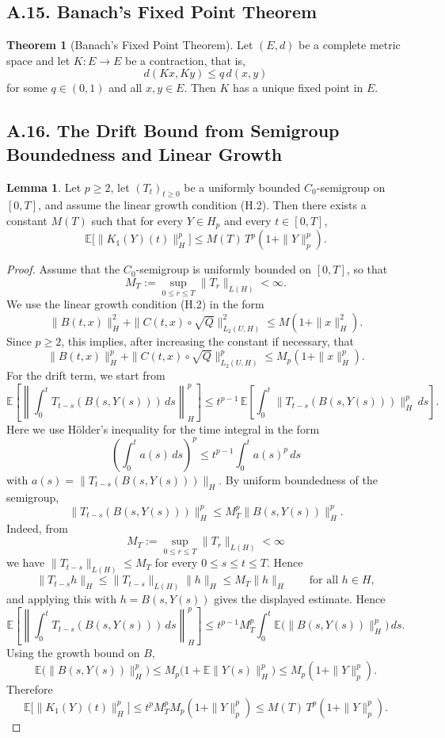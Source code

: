\documentclass[11pt]{article}
\theoremstyle{definition}
\newtheorem{theorem}{Theorem}
\newtheorem{lemma}{Lemma}
\theoremstyle{remark}
\begin{document}
\subsection*{A.15. Banach's Fixed Point Theorem}
\begin{theorem}[Banach's Fixed Point Theorem]
Let \((E,d)\) be a complete metric space and let \(K:E\to E\) be a contraction, that is,
\[
d(Kx,Ky)\le q\,d(x,y)
\]
for some \(q\in(0,1)\) and all \(x,y\in E\). Then \(K\) has a unique fixed point in \(E\).
\end{theorem}

\subsection*{A.16. The Drift Bound from Semigroup Boundedness and Linear Growth}
\begin{lemma}
Let \(p\ge 2\), let \((T_t)_{t\ge 0}\) be a uniformly bounded \(C_0\)-semigroup on \([0,T]\), and assume the linear growth condition \textnormal{(H.2)}. Then there exists a constant \(M(T)\) such that for every \(Y\in H_p\) and every \(t\in[0,T]\),
\[
\mathbb E\bigl[\|K_1(Y)(t)\|_H^p\bigr]
\le
M(T)\,T^p(1+\|Y\|_p^p).
\]
\end{lemma}
\begin{proof}
Assume that the \(C_0\)-semigroup is uniformly bounded on \([0,T]\), so that
\[
M_T:=\sup_{0\le r\le T}\|T_r\|_{L(H)}<\infty.
\]
We use the linear growth condition \textnormal{(H.2)} in the form
\[
\|B(t,x)\|_H^2+\|C(t,x)\circ \sqrt Q\|_{L_2(U,H)}^2\le M(1+\|x\|_H^2).
\]
Since \(p\ge 2\), this implies, after increasing the constant if necessary, that
\[
\|B(t,x)\|_H^p+\|C(t,x)\circ \sqrt Q\|_{L_2(U,H)}^p\le M_p(1+\|x\|_H^p).
\]
\noindent For the drift term, we start from
\[
\mathbb E\left[\left\|\int_0^t T_{t-s}(B(s,Y(s)))\,ds\right\|_H^p\right]
\le
t^{p-1}\,
\mathbb E\left[\int_0^t \|T_{t-s}(B(s,Y(s)))\|_H^p\,ds\right].
\]
Here we use H\"older's inequality for the time integral in the form
\[
\left(\int_0^t a(s)\,ds\right)^p
\le
t^{p-1}\int_0^t a(s)^p\,ds
\]
with \(a(s)=\|T_{t-s}(B(s,Y(s)))\|_H\).
By uniform boundedness of the semigroup,
\[
\|T_{t-s}(B(s,Y(s)))\|_H^p
\le
M_T^p\|B(s,Y(s))\|_H^p.
\]
Indeed, from
\[
M_T:=\sup_{0\le r\le T}\|T_r\|_{L(H)}<\infty
\]
we have \(\|T_{t-s}\|_{L(H)}\le M_T\) for every \(0\le s\le t\le T\). Hence
\[
\|T_{t-s}h\|_H\le \|T_{t-s}\|_{L(H)}\|h\|_H\le M_T\|h\|_H
\qquad\text{for all } h\in H,
\]
and applying this with \(h=B(s,Y(s))\) gives the displayed estimate.
Hence
\[
\mathbb E\left[\left\|\int_0^t T_{t-s}(B(s,Y(s)))\,ds\right\|_H^p\right]
\le
t^{p-1}M_T^p\int_0^t \mathbb E\bigl(\|B(s,Y(s))\|_H^p\bigr)\,ds.
\]
Using the growth bound on \(B\),
\[
\mathbb E\bigl(\|B(s,Y(s))\|_H^p\bigr)
\le
M_p\bigl(1+\mathbb E\|Y(s)\|_H^p\bigr)
\le
M_p(1+\|Y\|_p^p).
\]
Therefore
\[
\mathbb E\bigl[\|K_1(Y)(t)\|_H^p\bigr]
\le
t^pM_T^pM_p(1+\|Y\|_p^p)
\le
M(T)\,T^p(1+\|Y\|_p^p).
\]
\end{proof}
\end{document}
